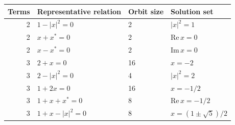 \begin{tabular}{@{}rlll@{}}
\toprule
Terms & Representative relation & Orbit size & Solution set \\
\midrule
2 & $1-|x|^2=0$ & 2 & $|x|^2=1$ \\
2 & $x+x^{*}=0$ & 2 & $\mathrm{Re}\,x=0$ \\
2 & $x-x^{*}=0$ & 2 & $\mathrm{Im}\,x=0$ \\
3 & $2+x=0$ & 16 & $x=-2$ \\
3 & $2-|x|^2=0$ & 4 & $|x|^2=2$ \\
3 & $1+2x=0$ & 16 & $x=-1/2$ \\
3 & $1+x+x^{*}=0$ & 8 & $\mathrm{Re}\,x=-1/2$ \\
3 & $1+x-|x|^2=0$ & 8 & $x=(1\pm\sqrt{5})/2$ \\
\bottomrule
\end{tabular}
